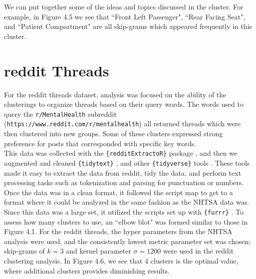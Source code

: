 We can put together some of the ideas and topics discussed in the cluster. For example, in Figure 4.5 we see that ``Front Left Passenger", ``Rear Facing Seat", and ``Patient Compartment" are all skip-grams which appeared frequently in this cluster.\\


\section{reddit Threads}

For the reddit threads dataset, analysis was focused on the ability of the clusterings to organize threads based on their query words. The words used to query the \texttt{r/MentalHealth} subreddit (\texttt{https://www.reddit.com/r/mentalhealth}) all returned threads which were then clustered into new groups. Some of these clusters expressed strong preference for posts that corresponded with specific key words. \\
This data was collected with the \texttt{\{redditExtractoR\}} package \cite{rivera2015package}, and then we augmented and cleaned \texttt{\{tidytext\}} \cite{silge2016tidytext}, and other \texttt{\{tidyverse\}} tools \cite{wickham2019welcome}. These tools made it easy to extract the data from reddit, tidy the data, and perform text processing tasks such as tokenization and parsing for punctuation or numbers. Once the data was in a clean format, it followed the script map to get to a format where it could be analyzed in the same fashion as the NHTSA data was. Since this data was a large set, it utilized the scripts set up with \texttt{\{furrr\}} \cite{bengtsson2020unifying}.
To assess how many clusters to use, an ``elbow blot" was formed similar to those in Figure 4.1. For the reddit threads, the hyper parameters from the NHTSA analysis were used, and the consistently lowest metric parameter set was chosen; skip-grams of $k=3$ and kernel parameter $\sigma = 1200$ were used in the reddit clustering analysis. In Figure 4.6, we see that 4 clusters is the optimal value, where additional clusters provides diminishing results. \\

